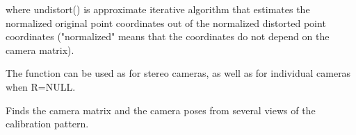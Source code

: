 where undistort() is approximate iterative algorithm that estimates the normalized original point coordinates out of the normalized distorted point coordinates ("normalized" means that the coordinates do not depend on the camera matrix).

The function can be used as for stereo cameras, as well as for individual cameras when R=NULL. 

\fi


\ifCpp

Finds the camera matrix and the camera poses from several views of the calibration pattern.

